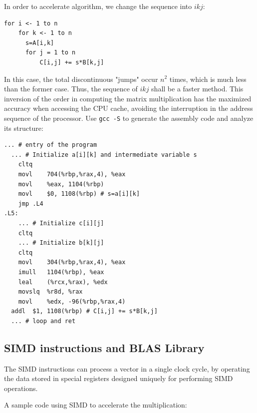 \documentclass[UTF8]{ctexart}
\begin{document}
In order to accelerate algorithm, we change the sequence into \(ikj\):

\begin{lstlisting}[style=pseudocode]
  for i <- 1 to n
    for k <- 1 to n
      s=A[i,k]
      for j = 1 to n
          C[i,j] += s*B[k,j]
\end{lstlisting}

In this case, the total discontinuous "jumps" occur \(n^2\) times,
which is much less than the former case. Thus, the sequence of \(ikj\)
shall be a faster method. This inversion of the order in computing the
matrix multiplication has the maximized accuracy when accessing the
CPU cache, avoiding the interruption in the address sequence of the
processor. Use \lstinline{gcc -S} to generate the assembly code and analyze its structure:

\begin{lstlisting}[style=pseudocode]
  ... # entry of the program
  ... # Initialize a[i][k] and intermediate variable s
	cltq
	movl	704(%rbp,%rax,4), %eax
	movl	%eax, 1104(%rbp)
	movl	$0, 1108(%rbp) # s=a[i][k]
	jmp	.L4
.L5:
	... # Initialize c[i][j]
	cltq
	... # Initialize b[k][j]
	cltq
	movl	304(%rbp,%rax,4), %eax
	imull	1104(%rbp), %eax
	leal	(%rcx,%rax), %edx
	movslq	%r8d, %rax
	movl	%edx, -96(%rbp,%rax,4)
  addl	$1, 1108(%rbp) # C[i,j] += s*B[k,j]
  ... # loop and ret
\end{lstlisting}

\subsection{SIMD instructions and BLAS Library}
\label{subsec::SIMDIaBLASL}
The SIMD instructions can process a vector in a single clock cycle, by operating the data stored in special registers designed uniquely for performing SIMD operations.

A sample code using SIMD to accelerate the multiplication:
\end{document}
